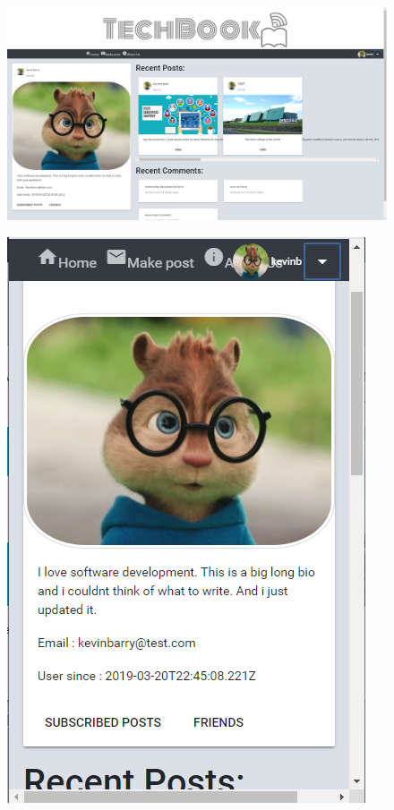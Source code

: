 \begin{figure}[H]
\centering
\begin{minipage}{.75\textwidth}
  \centering
  \includegraphics[width=.9\linewidth]{img/ui/profile_PC.PNG}
  \label{fig:profilePC}
\end{minipage}%
\begin{minipage}{.25\textwidth}
  \centering
  \includegraphics[width=.9\linewidth]{img/ui/profile_MOBILE.PNG}
  \label{fig:profileMOBILE}
\end{minipage}
\end{figure}

